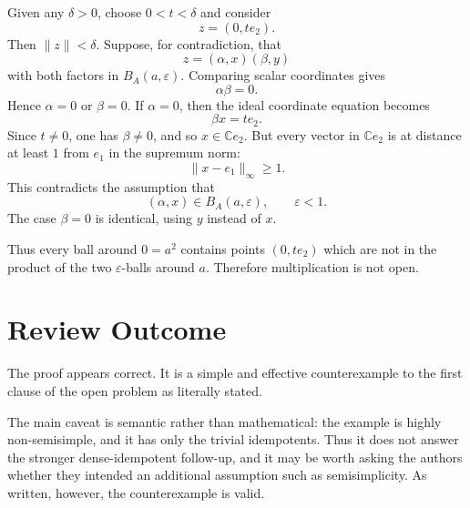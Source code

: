 \documentclass[11pt]{article}
\newcommand{\C}{\mathbb C}
\begin{document}
Given any \(\delta>0\), choose \(0<t<\delta\) and consider
\[
  z=(0,t e_2).
\]
Then \(\|z\|<\delta\).  Suppose, for contradiction, that
\[
  z=(\alpha,x)(\beta,y)
\]
with both factors in \(B_A(a,\varepsilon)\).  Comparing scalar coordinates
gives
\[
  \alpha\beta=0.
\]
Hence \(\alpha=0\) or \(\beta=0\).  If \(\alpha=0\), then the ideal
coordinate equation becomes
\[
  \beta x=t e_2.
\]
Since \(t\neq0\), one has \(\beta\neq0\), and so \(x\in \C e_2\).  But every
vector in \(\C e_2\) is at distance at least \(1\) from \(e_1\) in the
supremum norm:
\[
  \|x-e_1\|_\infty\geq 1.
\]
This contradicts the assumption that
\[
  (\alpha,x)\in B_A(a,\varepsilon),
  \qquad \varepsilon<1.
\]
The case \(\beta=0\) is identical, using \(y\) instead of \(x\).

Thus every ball around \(0=a^2\) contains points \((0,t e_2)\) which are not
in the product of the two \(\varepsilon\)-balls around \(a\).  Therefore
multiplication is not open.

\section*{Review Outcome}

The proof appears correct.  It is a simple and effective counterexample to
the first clause of the open problem as literally stated.

The main caveat is semantic rather than mathematical: the example is highly
non-semisimple, and it has only the trivial idempotents.  Thus it does not
answer the stronger dense-idempotent follow-up, and it may be worth asking the
authors whether they intended an additional assumption such as semisimplicity.
As written, however, the counterexample is valid.
\end{document}
